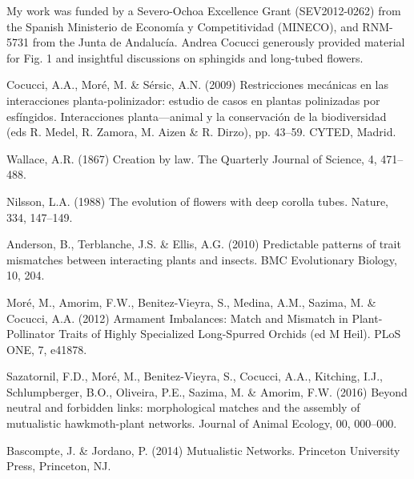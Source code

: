 \documentclass[a4paper,12pt]{article}
\begin{document}
My work was funded by a Severo-Ochoa Excellence Grant (SEV2012-0262) from the Spanish Ministerio de Econom\'ia y Competitividad (MINECO), and RNM-5731 from the Junta de Andaluc\'ia. Andrea Cocucci generously provided material for Fig. 1 and insightful discussions on sphingids and long-tubed flowers.

\newpage

% 

\begin{thebibliography}{10}

Cocucci, A.A., Mor\'e, M. \& S\'ersic, A.N. (2009) Restricciones mec\'anicas en las interacciones planta-polinizador: estudio de casos en plantas polinizadas por esf\'ingidos. Interacciones planta---animal y la conservaci\'on de la biodiversidad (eds R. Medel, R. Zamora, M. Aizen \& R. Dirzo), pp. 43–59. CYTED, Madrid.

Wallace, A.R. (1867) Creation by law. The Quarterly Journal of Science, 4, 471–488.

Nilsson, L.A. (1988) The evolution of flowers with deep corolla tubes. Nature, 334, 147–149.

Anderson, B., Terblanche, J.S. \& Ellis, A.G. (2010) Predictable patterns of trait mismatches between interacting plants and insects. BMC Evolutionary Biology, 10, 204.

Moré, M., Amorim, F.W., Benitez-Vieyra, S., Medina, A.M., Sazima, M. \& Cocucci, A.A. (2012) Armament Imbalances: Match and Mismatch in Plant-Pollinator Traits of Highly Specialized Long-Spurred Orchids (ed M Heil). PLoS ONE, 7, e41878.

Sazatornil, F.D., Moré, M., Benitez-Vieyra, S., Cocucci, A.A., Kitching, I.J., Schlumpberger, B.O., Oliveira, P.E., Sazima, M. \& Amorim, F.W. (2016) Beyond neutral and forbidden links: morphological matches and the assembly of mutualistic hawkmoth-plant networks. Journal of Animal Ecology, 00, 000–000.

Bascompte, J. \& Jordano, P. (2014) Mutualistic Networks. Princeton University Press, Princeton, NJ.

\end{thebibliography}

\end{document}
